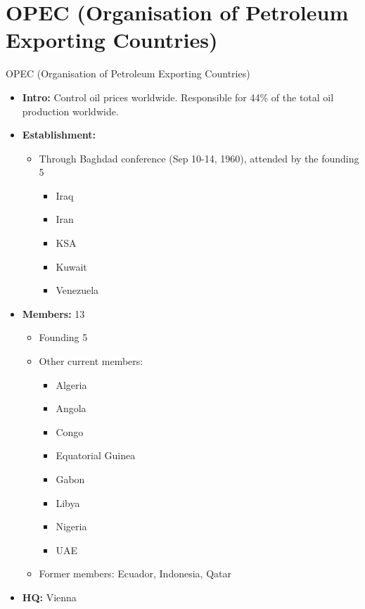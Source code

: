 \documentclass[
  10pt,
  ignorenonframetext,
  progressbar=frametitle]{beamer}
\providecommand{\tightlist}{%
  \setlength{\itemsep}{0pt}\setlength{\parskip}{0pt}}
\begin{document}
\section{OPEC (Organisation of Petroleum Exporting Countries)}
\begin{frame}[allowframebreaks]
{OPEC (Organisation of Petroleum Exporting Countries)}
\protect\hypertarget{opec-organisation-of-petroleum-exporting-countries}{}
\begin{itemize}
\tightlist
\item
  \textbf{Intro:} Control oil prices worldwide. Responsible for 44\% of
  the total oil production worldwide.
\item
  \textbf{Establishment:}

  \begin{itemize}
  \tightlist
  \item
    Through Baghdad conference (Sep 10-14, 1960), attended by the
    founding 5

    \begin{itemize}
    \tightlist
    \item
      Iraq
    \item
      Iran
    \item
      KSA
    \item
      Kuwait
    \item
      Venezuela
    \end{itemize}
  \end{itemize}
\item
  \textbf{Members:} 13

  \begin{itemize}
  \tightlist
  \item
    Founding 5
  \item
    Other current members:

    \begin{itemize}
    \tightlist
    \item
      Algeria
    \item
      Angola
    \item
      Congo
    \item
      Equatorial Guinea
    \item
      Gabon
    \item
      Libya
    \item
      Nigeria
    \item
      UAE
    \end{itemize}
  \item
    Former members: Ecuador, Indonesia, Qatar
  \end{itemize}
\item
  \textbf{HQ:} Vienna
\end{itemize}
\end{frame}
\end{document}
